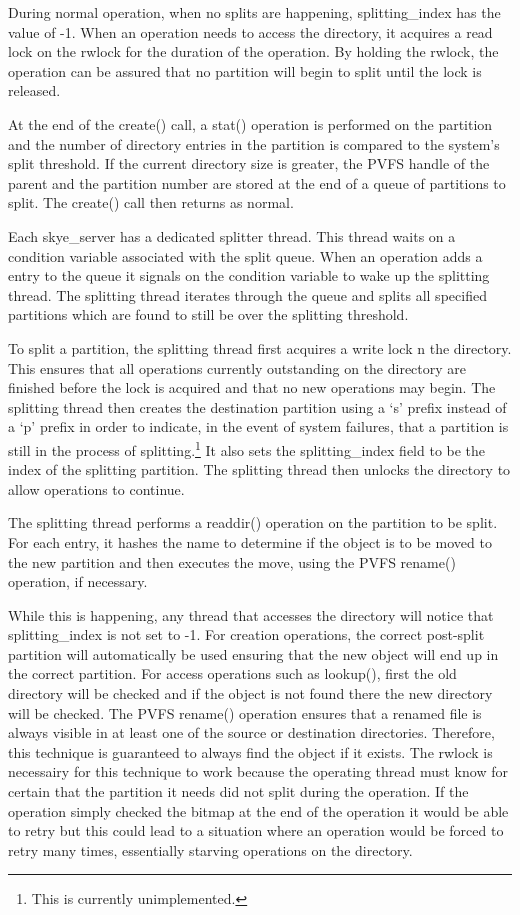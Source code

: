 \documentclass[letterpaper]{article}
\begin{document}
During normal operation, when no splits are happening, splitting\_\-index has the
value of -1.  When an operation needs to access the directory, it acquires a
read lock on the rwlock for the duration of the operation.  By holding the
rwlock, the operation can be assured that no partition will begin to split until
the lock is released.

At the end of the create() call, a stat() operation is performed on the
partition and the number of directory entries in the partition is compared to
the system's split threshold.  If the current directory size is greater, the
PVFS handle of the parent and the partition number are stored at the end of a
queue of partitions to split.  The create() call then returns as normal.

Each skye\_\-server has a dedicated splitter thread.  This thread waits on a
condition variable associated with the split queue.  When an operation adds a
entry to the queue it signals on the condition variable to wake up the splitting
thread.  The splitting thread iterates through the queue and splits all
specified partitions which are found to still be over the splitting threshold.

To split a partition, the splitting thread first acquires a write lock n the
directory.  This ensures that all operations currently outstanding on the
directory are finished before the lock is acquired and that no new operations
may begin.  The splitting thread then creates the destination partition using a
`s' prefix instead of a `p' prefix in order to indicate, in the event of system
failures, that a partition is still in the process of splitting.\footnote{This
is currently unimplemented.}  It also sets the splitting\_\-index field to be
the index of the splitting partition.  The splitting thread then unlocks the
directory to allow operations to continue.

The splitting thread performs a readdir() operation on the partition to be
split.  For each entry, it hashes the name to determine if the object is to be
moved to the new partition and then executes the move, using the PVFS rename()
operation, if necessary.

While this is happening, any thread that accesses the directory will notice that
splitting\_\-index is not set to -1.  For creation operations, the correct
post-split partition will automatically be used ensuring that the new object
will end up in the correct partition.  For access operations such as lookup(),
first the old directory will be checked and if the object is not found there the
new directory will be checked.  The PVFS rename() operation ensures that a
renamed file is always visible in at least one of the source or destination
directories.  Therefore, this technique is guaranteed to always find the object 
if it exists.  The rwlock is necessairy for this technique to work because the
operating thread must know for certain that the partition it needs did not split
during the operation.  If the operation simply checked the bitmap at the end of
the operation it would be able to retry but this could lead to a situation where
an operation would be forced to retry many times, essentially starving
operations on the directory.
\end{document}
